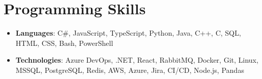 \documentclass[letterpaper,11pt]{article}
\newcommand{\resumeItem}[1]{
  \item\small{
    \textbf{#1 \vspace{-2pt}}
  }
}
\newcommand{\resumeSubItem}[2]{\resumeItem{#1}{#2}\vspace{-4pt}}
\newcommand{\resumeSubHeadingListStart}{\begin{itemize}[leftmargin=*]}
\newcommand{\resumeSubHeadingListEnd}{\end{itemize}}
\begin{document}
\begin{comment}
\section{Projects}
  \resumeSubHeadingListStart
    \resumeSubItem{QuantSoftware Toolkit}
      {Open source python library for financial data analysis and machine learning for finance.}
    \resumeSubItem{Github Visualization}
      {Data Visualization of Git Log data using D3 to analyze project trends over time.}
    \resumeSubItem{Recommendation System}
      {Music and Movie recommender systems using collaborative filtering on public datasets.}
    \resumeSubItem{Mac Setup}
      {Book that gives step by step instructions on setting up developer environment on Mac OS.}
  \resumeSubHeadingListEnd
\end{comment}

%
\section{Programming Skills}
  \resumeSubHeadingListStart
    \item{
      \textbf{Languages}{: C\#, JavaScript, TypeScript, Python, Java, C++, C, SQL, HTML, CSS, Bash, PowerShell}
    }
    \item{
      \textbf{Technologies}{: Azure DevOps, .NET, React, RabbitMQ, Docker, Git, Linux, MSSQL, PostgreSQL, Redis, AWS, Azure, Jira, CI/CD, Node.js, Pandas}
    }
  \resumeSubHeadingListEnd


\end{document}
